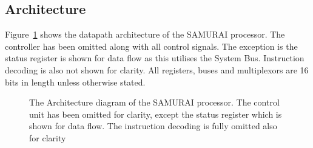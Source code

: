 \subsection{Architecture}

Figure~\ref{fig:architecture} shows the datapath architecture of the SAMURAI processor. 
The controller has been omitted along with all control signals. 
The exception is the status register is shown for data flow as this utilises the System Bus. 
Instruction decoding is also not shown for clarity. 
All registers, buses and multiplexors are 16 bits in length unless otherwise stated. 

\begin{figure}
\caption{The Architecture diagram of the SAMURAI processor. The control unit has been omitted for clarity, except the status register which is shown for data flow. 
The instruction decoding is fully omitted also for clarity}
\label{fig:architecture}
\end{figure}
